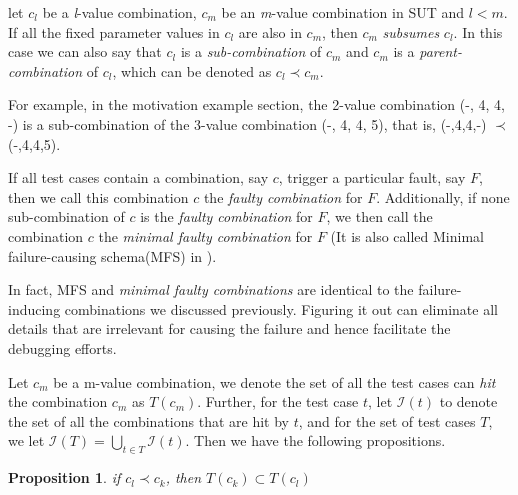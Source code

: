 \documentclass{sig-alternate}
\begin{document}
\begin{definition}
let $c_{l}$ be a \emph{l}-value combination, $c_{m}$ be an \emph{m}-value combination in SUT and $l < m$. If all the fixed parameter values in $c_{l}$ are also in $c_{m}$, then $c_{m}$ \emph{subsumes} $c_{l}$. In this case we can also say that $c_{l}$ is a \emph{sub-combination} of $c_{m}$ and $c_{m}$ is a \emph{parent-combination} of $c_{l}$, which can be denoted as $c_{l} \prec  c_{m}$.
\end{definition}

For example, in the motivation example section, the 2-value combination (-, 4, 4, -) is a sub-combination of the 3-value combination (-, 4, 4, 5), that is, (-,4,4,-) $\prec$ (-,4,4,5).

\begin{definition}
If all test cases contain a combination, say $c$, trigger a particular fault, say $F$, then we call this combination $c$ the \emph{faulty combination} for $F$. Additionally, if none sub-combination of $c$ is the \emph{faulty combination} for $F$, we then call the combination $c$ the \emph{minimal faulty combination} for $F$ (It is also called Minimal failure-causing schema(MFS) in \cite{nie2011minimal}).

\end{definition}

In fact, MFS and \emph{minimal faulty combinations} are identical to the failure-inducing combinations we discussed previously. Figuring it out can eliminate all details that are irrelevant for causing the failure and hence facilitate the debugging efforts.

%

Let $c_{m}$ be a m-value combination, we denote the set of all the test cases can \emph{hit} the combination $c_{m}$ as $T(c_{m})$. Further, for the test case $t$, let $\mathcal{I}(t)$ to denote the set of all the combinations that are hit by $t$, and for the set of test cases $T$, we let $\mathcal{I}(T) = \bigcup_{t\in T} \mathcal{I}(t)$. Then we have the following propositions.


\newtheorem{proposition}{Proposition}
\begin{proposition}
if $c_{l} \prec c_{k}$, then $T(c_{k}) \subset T(c_{l})$
\end{proposition}
\end{document}
